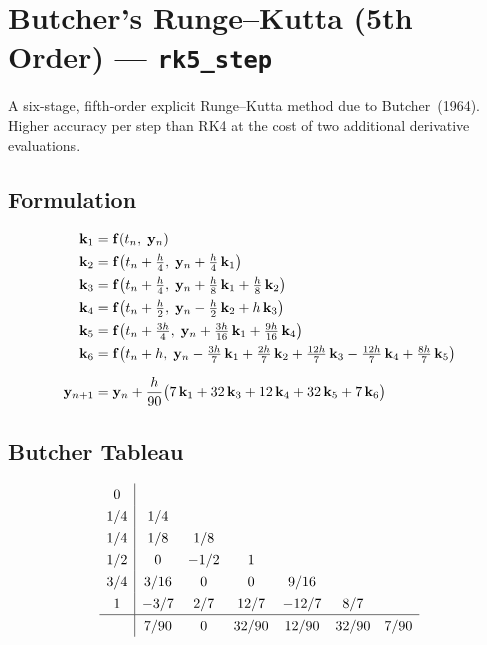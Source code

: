 \documentclass[11pt,a4paper]{article}
\newcommand{\bk}{\mathbf{k}}
\newcommand{\by}{\mathbf{y}}
\newcommand{\bff}{\mathbf{f}}
\begin{document}
\section{Butcher's Runge--Kutta (5th Order) --- \texttt{rk5\_step}}
\label{sec:rk5}

A six-stage, fifth-order explicit Runge--Kutta method due to Butcher~(1964).
Higher accuracy per step than RK4 at the cost of two additional derivative
evaluations.

\subsection{Formulation}
\begin{align}
  \bk_1 &= \bff(t_n,\;\by_n) \notag\\
  \bk_2 &= \bff\!\left(t_n + \tfrac{h}{4},\;\by_n + \tfrac{h}{4}\,\bk_1\right) \notag\\
  \bk_3 &= \bff\!\left(t_n + \tfrac{h}{4},\;\by_n + \tfrac{h}{8}\,\bk_1
            + \tfrac{h}{8}\,\bk_2\right) \notag\\
  \bk_4 &= \bff\!\left(t_n + \tfrac{h}{2},\;\by_n - \tfrac{h}{2}\,\bk_2
            + h\,\bk_3\right) \notag\\
  \bk_5 &= \bff\!\left(t_n + \tfrac{3h}{4},\;\by_n + \tfrac{3h}{16}\,\bk_1
            + \tfrac{9h}{16}\,\bk_4\right) \notag\\
  \bk_6 &= \bff\!\left(t_n + h,\;\by_n - \tfrac{3h}{7}\,\bk_1
            + \tfrac{2h}{7}\,\bk_2 + \tfrac{12h}{7}\,\bk_3
            - \tfrac{12h}{7}\,\bk_4 + \tfrac{8h}{7}\,\bk_5\right) \notag\\[6pt]
  \by_{n+1} &= \by_n + \frac{h}{90}\bigl(7\,\bk_1 + 32\,\bk_3
            + 12\,\bk_4 + 32\,\bk_5 + 7\,\bk_6\bigr)
  \label{eq:rk5}
\end{align}

\subsection{Butcher Tableau}
\[
\renewcommand{\arraystretch}{1.3}
\begin{array}{c|cccccc}
  0    &       &       &       &        &      &      \\
  1/4  & 1/4   &       &       &        &      &      \\
  1/4  & 1/8   & 1/8   &       &        &      &      \\
  1/2  & 0     & -1/2  & 1     &        &      &      \\
  3/4  & 3/16  & 0     & 0     & 9/16   &      &      \\
  1    & -3/7  & 2/7   & 12/7  & -12/7  & 8/7  &      \\
  \hline
       & 7/90  & 0     & 32/90 & 12/90  & 32/90 & 7/90 \\
\end{array}
\]
\end{document}
